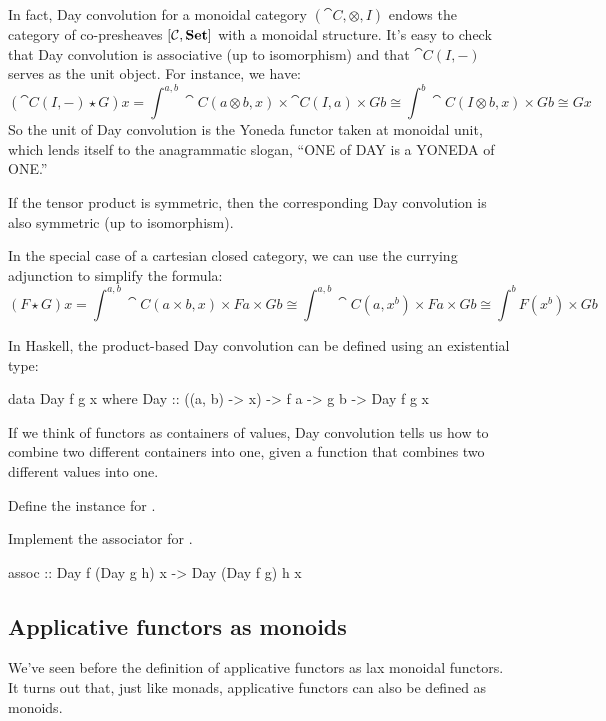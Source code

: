 \documentclass[DaoFP]{subfiles}
\begin{document}
In fact, Day convolution for a monoidal category $(\cat C, \otimes, I)$ endows the category of co-presheaves $[\mathcal{C}, \mathbf{Set}]$ with a monoidal structure. It's easy to check that Day convolution is associative (up to isomorphism) and that $\cat C(I, -)$ serves as the unit object. For instance, we have:
\[ (\cat C(I, -) \star G) x =  \int^{a, b} \cat C (a \otimes b, x) \times \cat C(I, a) \times G b \cong 
  \int^{b} \cat C (I \otimes b, x) \times  G b \cong G x\]
So the unit of Day convolution is the Yoneda functor taken at monoidal unit, which lends itself to the anagrammatic slogan, ``ONE of DAY is a YONEDA of ONE.''

If the tensor product is symmetric, then the corresponding Day convolution is also symmetric (up to isomorphism).

In the special case of a cartesian closed category, we can use the currying adjunction to simplify the formula:
\[ (F \star G) x = \int^{a, b} \cat C (a \times b, x) \times F a \times G b \cong  \int^{a, b} \cat C (a, x^b) \times F a \times G b \cong  \int^{b}  F (x^b) \times G b\]

In Haskell, the product-based Day convolution can be defined using an existential type:
\begin{haskell}
data Day f g x where
  Day :: ((a, b) -> x) -> f a -> g b -> Day f g x
\end{haskell}

If we think of functors as containers of values, Day convolution tells us how to combine two different containers into one, given a function that combines two different values into one. 

\begin{exercise}
Define the  instance for .
\end{exercise}

\begin{exercise}
Implement the associator for .
\begin{haskell}
assoc :: Day f (Day g h) x -> Day (Day f g) h x
\end{haskell}
\end{exercise}


\subsection{Applicative functors as monoids}
 
 We've seen before the definition of applicative functors as lax monoidal functors. It turns out that, just like monads, applicative functors can also be defined as monoids. 
 
\end{document}
